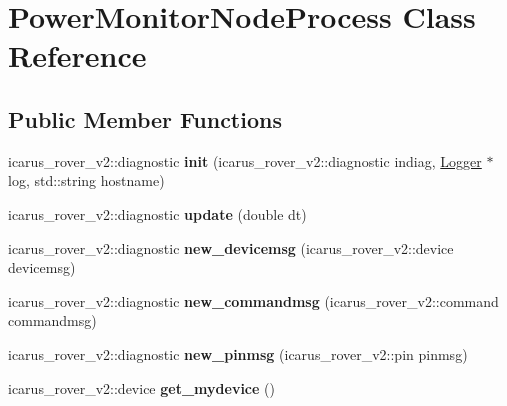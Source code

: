 \hypertarget{classPowerMonitorNodeProcess}{}\section{Power\+Monitor\+Node\+Process Class Reference}
\label{classPowerMonitorNodeProcess}
\subsection*{Public Member Functions}
\begin{DoxyCompactItemize}
\item 
\mbox{\label{classPowerMonitorNodeProcess_a553de2bf42880ff9e84a08c29d9f4a60}} 
icarus\+\_\+rover\+\_\+v2\+::diagnostic {\bfseries init} (icarus\+\_\+rover\+\_\+v2\+::diagnostic indiag, \hyperlink{classLogger}{Logger} $\ast$log, std\+::string hostname)
\item 
\mbox{\label{classPowerMonitorNodeProcess_a0b32967709e89f3e5531c93cc8eba3e6}} 
icarus\+\_\+rover\+\_\+v2\+::diagnostic {\bfseries update} (double dt)
\item 
\mbox{\label{classPowerMonitorNodeProcess_a5269554b11cba13c2b9b7af49c738f60}} 
icarus\+\_\+rover\+\_\+v2\+::diagnostic {\bfseries new\+\_\+devicemsg} (icarus\+\_\+rover\+\_\+v2\+::device devicemsg)
\item 
\mbox{\label{classPowerMonitorNodeProcess_a730ce3d9a2e60f969a656774d60fb6ee}} 
icarus\+\_\+rover\+\_\+v2\+::diagnostic {\bfseries new\+\_\+commandmsg} (icarus\+\_\+rover\+\_\+v2\+::command commandmsg)
\item 
\mbox{\label{classPowerMonitorNodeProcess_a72a257938b7c28144bda13ddc14f07b7}} 
icarus\+\_\+rover\+\_\+v2\+::diagnostic {\bfseries new\+\_\+pinmsg} (icarus\+\_\+rover\+\_\+v2\+::pin pinmsg)
\item 
\mbox{\label{classPowerMonitorNodeProcess_a2f2b986b68966f3061a63f96f3a89dbc}} 
icarus\+\_\+rover\+\_\+v2\+::device {\bfseries get\+\_\+mydevice} ()
\item 
\mbox{\label{classPowerMonitorNodeProcess_a9466224e2ce1bafdf4ef7c61117f278a}} 

\end{DoxyCompactItemize}
